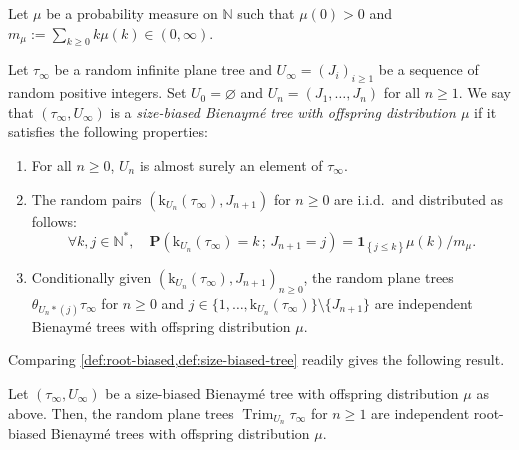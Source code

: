 \documentclass[11pt,reqno]{amsart}
\newcommand{\N}{\mathbb{N}}
\renewcommand{\P}{\mathbf{P}}
\newcommand{\1}{\mathbf{1}}
\newcommand{\0}{\mathbf{0}}
\newcommand{\I}[1]{{\mathbf 1}_{\left\{#1\right\}}}
\newcommand{\rk}{\mathrm{k}}
\newcommand{\Trim}{\operatorname{Trim}}
\begin{document}
Let $\mu$ be a probability measure on $\N$ such that $\mu(0)>0$ and $m_\mu:=\sum_{k\geq 0}k\mu(k)\in(0,\infty)$.

\begin{defn}\label{def:size-biased-tree}
Let $\tau_\infty$ be a random infinite plane tree and $U_\infty=(J_i)_{i\geq 1}$ be a sequence of random positive integers. Set $U_0=\varnothing$ and $U_n=(J_1,\ldots,J_n)$ for all $n\geq 1$. We say that $(\tau_\infty,U_\infty)$ is a \emph{size-biased Bienaymé tree with offspring distribution $\mu$} if it satisfies the following properties:
\begin{enumerate}
    \item[(a)] For all $n\geq 0$, $U_n$ is almost surely an element of $\tau_\infty$.
    \item[(b)] The random pairs $(\rk_{U_n}(\tau_\infty),J_{n+1})$ for $n\geq 0$ are i.i.d.~and distributed as follows:
    \[\forall k,j\in\N^*,\quad \P(\rk_{U_n}(\tau_\infty)=k\, ;\, J_{n+1}=j)=\I{j\leq k}\mu(k)/m_\mu.\]
    \item[(c)] Conditionally given $(\rk_{U_n}(\tau_\infty),J_{n+1})_{n\geq 0}$, the random plane trees $\theta_{U_n*(j)}\tau_\infty$ for $n\geq 0$ and $j\in \{1,\ldots,\rk_{U_n}(\tau_\infty)\}\setminus\{J_{n+1}\}$ are independent Bienaymé trees with offspring distribution $\mu$.
\end{enumerate}
\end{defn}

Comparing \cref{def:root-biased,def:size-biased-tree} readily gives the following result.

\begin{prop}
\label{root-biased_VS_size-biased}
Let $(\tau_\infty,U_\infty)$ be a size-biased Bienaymé tree with offspring distribution $\mu$ as above. Then, the random plane trees $\Trim_{U_n}\tau_\infty$ for $n\geq 1$ are independent root-biased Bienaymé trees with offspring distribution $\mu$.
\end{prop}
\end{document}
